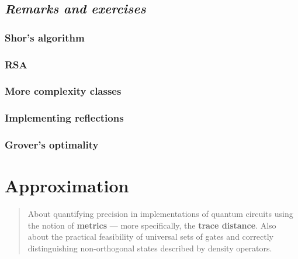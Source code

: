 \documentclass[fleqn]{article}
\let\oldsection\section
\renewcommand\section{\clearpage\oldsection}
\begin{document}
\hypertarget{remarks-and-exercises-algorithms}{%
\subsection{\texorpdfstring{\emph{Remarks and exercises}}{Remarks and exercises}}\label{remarks-and-exercises-algorithms}}

\hypertarget{shors-algorithm}{%
\subsubsection{Shor's algorithm}\label{shors-algorithm}}

\hypertarget{rsa}{%
\subsubsection{RSA}\label{rsa}}

\hypertarget{more-complexity-classes}{%
\subsubsection{More complexity classes}\label{more-complexity-classes}}

\hypertarget{implementing-reflections}{%
\subsubsection{Implementing reflections}\label{implementing-reflections}}

\hypertarget{grovers-optimality}{%
\subsubsection{Grover's optimality}\label{grovers-optimality}}

\hypertarget{approximation}{%
\section{Approximation}\label{approximation}}

\begin{quote}
About quantifying precision in implementations of quantum circuits using the notion of \textbf{metrics} --- more specifically, the \textbf{trace distance}.
Also about the practical feasibility of universal sets of gates and correctly distinguishing non-orthogonal states described by density operators.
\end{quote}
\end{document}
